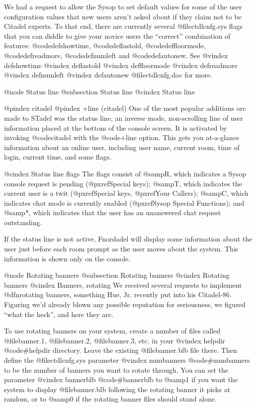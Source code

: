 {{{We had a request to allow the Sysop to set default values for some of
the user configuration values that new users aren't asked about if
they claim not to be Citadel experts.  To that end, there are currently
several @file{ctdlcnfg.sys} flags that you can diddle to give your novice users
the ``correct'' combination of features: @code{defshowtime}, @code{deflastold},
@code{deffloormode}, @code{defreadmore}, @code{defnumleft} and
@code{defautonew}.  See
@vindex defshowtime
@vindex deflastold
@vindex deffloormode
@vindex defreadmore
@vindex defnumleft
@vindex defautonew
@file{ctdlcnfg.doc} for more.

@node Status line
@subsection Status line
@cindex Status line

@pindex citadel
@pindex +line (citadel)
One of the most popular additions orc made to STadel was the status line, an
inverse mode, non-scrolling line of user information placed at the bottom
of the console screen.  It is activated by invoking @code{citadel} with
the @code{+line} option.  This gets you at-a-glance information about an
online user, including user name, current room, time of login, current
time, and some flags.

@cindex Status line flags
The flags consist of @samp{R}, which indicates a Sysop console request is
pending (@pxref{Special keys}); @samp{T}, which indicates the current user
is a twit (@pxref{Special keys}, @pxref{Your Callers}); @samp{C}, which
indicates chat mode is currently enabled (@pxref{Sysop Special Functions});
and @samp{*}, which indicates that the user has an unanswered chat request
outstanding.

If the status line is not active, Fnordadel will display some information
about the user just before each room prompt as the user moves about the
system.  This information is shown only on the console.

@node Rotating banners
@subsection Rotating banners
@cindex Rotating banners
@cindex Banners, rotating
We received several requests to implement @dfn{rotating banners}, something
Hue, Jr. recently put into his Citadel-86.  Figuring we'd already blown any
possible reputation for seriousness, we figured ``what the heck'', and here
they are.

To use rotating banners on your system, create a number of files called
@file{banner.1}, @file{banner.2}, @file{banner.3}, etc. in your
@vindex helpdir
@code{#helpdir} directory.  Leave the existing @file{banner.blb} file there.
Then define the @file{ctdlcnfg.sys} parameter
@vindex numbanners
@code{#numbanners} to be the number of banners you want to rotate through.
You can set the parameter
@vindex bannerblb
@code{#bannerblb} to @samp{1} if you want the system to display
@file{banner.blb} following the rotating banner it picks at random, or to
@samp{0} if the rotating banner files should stand alone.

}}}
